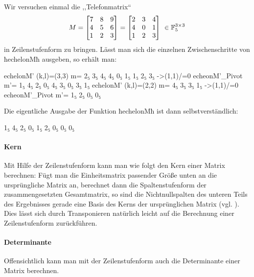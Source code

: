 

\begin{beispiel}
  Wir versuchen einmal die ,,Telefonmatrix`` 
  \[ M = \begin{bmatrix} 7&8&9\\ 4&5&6\\ 1&2&3\end{bmatrix} = 
      \begin{bmatrix}2&3&4 \\ 4&0&1\\ 1&2&3\end{bmatrix} \ 
      \in \F_5^{3\times 3}\]
  in Zeilenstufenform zu bringen. Lässt man sich die einzelnen 
  Zwischenschritte von ħechelonMħ ausgeben, so erhält man:
  \begin{hcode}
echelonM' (k,l)=(3,3) m=
2₅ 3₅ 4₅ 
4₅ 0₅ 1₅ 
1₅ 2₅ 3₅ 
	->(1,1)/=0
echeonM'_Pivot m'=
1₅ 4₅ 2₅ 
0₅ 4₅ 3₅ 
0₅ 3₅ 1₅
echelonM' (k,l)=(2,2) m=
4₅ 3₅ 
3₅ 1₅ 
	->(1,1)/=0
echeonM'_Pivot m'=
1₅ 2₅ 
0₅ 0₅ 
  \end{hcode}
  Die eigentliche Ausgabe der Funktion ħechelonMħ ist dann selbstverständlich:
\begin{hcode}
1₅ 4₅ 2₅ 
0₅ 1₅ 2₅ 
0₅ 0₅ 0₅ 
\end{hcode}
\end{beispiel}


\paragraph{Kern} Mit Hilfe der Zeilenstufenform kann man wie folgt den Kern 
einer Matrix berechnen: Fügt man die Einheitsmatrix passender Größe unten an
die ursprüngliche Matrix an, berechnet dann die Spaltenstufenform der
zusammengesetzten Gesamtmatrix, so sind die Nichtnullspalten des unteren Teils
des Ergebnisses gerade eine Basis des Kerns der ursprünglichen Matrix (vgl.
\cite[Abschnitt Basis]{wiki:matrix-kernel}). Dies lässt sich durch
Transponieren natürlich leicht auf die Berechnung einer Zeilenstufenform
zurückführen.


\paragraph{Determinante} Offensichtlich kann man mit der Zeilenstufenform auch
die Determinante einer Matrix berechnen.


